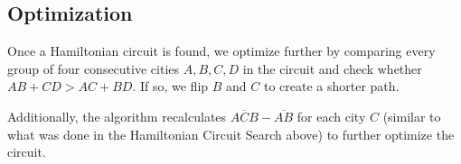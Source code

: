 \documentclass[letterpaper,12pt]{article}
\begin{document}

		\subsection{Optimization}
			Once a Hamiltonian circuit is found, we optimize further by
			comparing every group of four consecutive cities $A, B, C, D$ in
			the circuit and check whether $AB+CD > AC+BD$. If so, we flip $B$
			and $C$ to create a shorter path.

			Additionally, the algorithm recalculates $\overline{ACB}
			- \overline{AB}$ for each city $C$ (similar to what was done in the
			Hamiltonian Circuit Search above) to further optimize the circuit.


\end{document}
